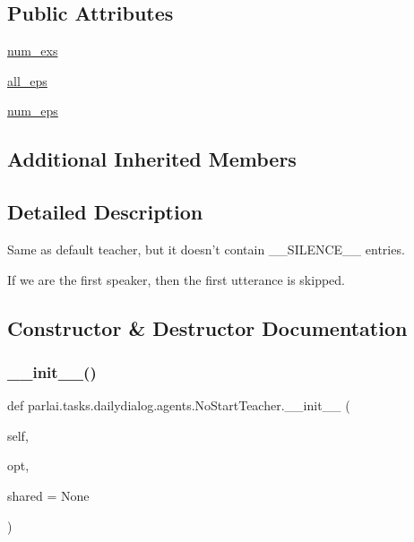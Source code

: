 \subsection*{Public Attributes}
\begin{DoxyCompactItemize}
\item 
\hyperlink{classparlai_1_1tasks_1_1dailydialog_1_1agents_1_1NoStartTeacher_aab39a1a4cec18469e61f2431e85b6fd1}{num\+\_\+exs}
\item 
\hyperlink{classparlai_1_1tasks_1_1dailydialog_1_1agents_1_1NoStartTeacher_adb1dd6164639fbe3d4bf53a26f0431ee}{all\+\_\+eps}
\item 
\hyperlink{classparlai_1_1tasks_1_1dailydialog_1_1agents_1_1NoStartTeacher_ac31b7ae1fa0c534af1530fe395d90252}{num\+\_\+eps}
\end{DoxyCompactItemize}
\subsection*{Additional Inherited Members}


\subsection{Detailed Description}
\begin{DoxyVerb}Same as default teacher, but it doesn't contain __SILENCE__ entries.

If we are the first speaker, then the first utterance is skipped.
\end{DoxyVerb}
 

\subsection{Constructor \& Destructor Documentation}
\mbox{\label{classparlai_1_1tasks_1_1dailydialog_1_1agents_1_1NoStartTeacher_aa9ca29c5550b1ec3fe80c7254e36aead}} 
\subsubsection{\texorpdfstring{\+\_\+\+\_\+init\+\_\+\+\_\+()}{\_\_init\_\_()}}
{\footnotesize\ttfamily def parlai.\+tasks.\+dailydialog.\+agents.\+No\+Start\+Teacher.\+\_\+\+\_\+init\+\_\+\+\_\+ (\begin{DoxyParamCaption}\item[{}]{self,  }\item[{}]{opt,  }\item[{}]{shared = {\ttfamily None} }\end{DoxyParamCaption})}



